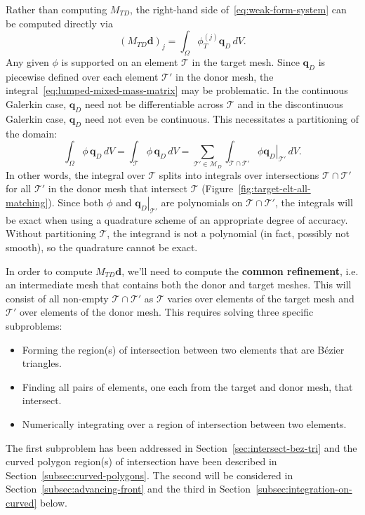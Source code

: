 Rather than computing \(M_{TD}\), the right-hand side
of~\eqref{eq:weak-form-system} can be computed directly via
\begin{equation}\label{eq:lumped-mixed-mass-matrix}
\left(M_{TD} \bm{d}\right)_j = \int_{\Omega} \phi_T^{(j)} \bm{q}_D \, dV.
\end{equation}
Any given \(\phi\) is supported on an element \(\mathcal{T}\) in the
target mesh. Since \(\bm{q}_D\) is piecewise defined over each element
\(\mathcal{T}'\) in the donor mesh, the
integral~\eqref{eq:lumped-mixed-mass-matrix} may be problematic.
In the continuous Galerkin case, \(\bm{q}_D\) need not be differentiable
across \(\mathcal{T}\) and in the discontinuous Galerkin case,
\(\bm{q}_D\) need not even be continuous. This necessitates a
partitioning of the domain:
\begin{equation}
\int_{\Omega} \phi \, \bm{q}_D \, dV =
  \int_{\mathcal{T}} \phi \, \bm{q}_D \, dV =
  \sum_{\mathcal{T}' \in \mathcal{M}_D} \int_{\mathcal{T} \cap \mathcal{T}'}
    \phi \left.\bm{q}_D\right|_{\mathcal{T}'} \, dV.
\end{equation}
In other words, the integral over \(\mathcal{T}\) splits into integrals
over intersections \(\mathcal{T} \cap \mathcal{T}'\) for all
\(\mathcal{T}'\) in the donor mesh that intersect \(\mathcal{T}\)
(Figure~\ref{fig:target-elt-all-matching}). Since both \(\phi\) and
\(\left.\bm{q}_D\right|_{\mathcal{T}'}\) are polynomials on
\(\mathcal{T} \cap \mathcal{T}'\), the integrals will be exact when
using a quadrature scheme of an appropriate degree of accuracy.
Without partitioning \(\mathcal{T}\), the integrand is not a polynomial
(in fact, possibly not smooth), so the quadrature cannot be exact.

In order to compute \(M_{TD} \bm{d}\), we'll need to compute the
\textbf{common refinement}, i.e. an intermediate mesh that contains
both the donor and target meshes. This will consist of all non-empty
\(\mathcal{T} \cap \mathcal{T}'\) as \(\mathcal{T}\) varies over
elements of the target mesh and \(\mathcal{T}'\) over elements of the
donor mesh. This requires solving three specific subproblems:
\begin{itemize}
\itemsep 0em
\item Forming the region(s) of intersection between two elements that
  are B\'{e}zier triangles.
\item Finding all pairs of elements, one each from the target and donor mesh,
  that intersect.
\item Numerically integrating over a region of intersection between two
  elements.
\end{itemize}
The first subproblem has been addressed in Section~\ref{sec:intersect-bez-tri}
and the curved polygon region(s) of intersection have been described
in Section~\ref{subsec:curved-polygons}. The second will be considered
in Section~\ref{subsec:advancing-front} and the third in
Section~\ref{subsec:integration-on-curved} below.

